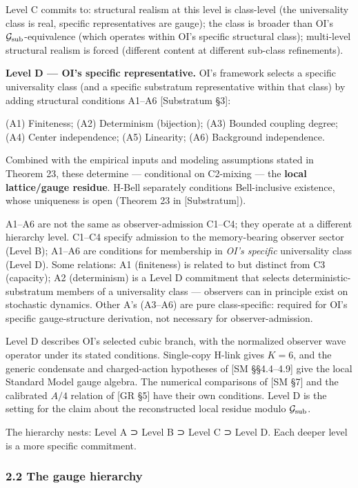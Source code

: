 \documentclass[
]{article}
\begin{document}
Level C commits to: structural realism at this level is class-level (the
universality class is real, specific representatives are gauge); the
class is broader than OI's \(\mathcal{G}_{\rm sub}\)-equivalence (which
operates within OI's specific structural class); multi-level structural
realism is forced (different content at different sub-class
refinements).

\textbf{Level D --- OI's specific representative.} OI's framework
selects a specific universality class (and a specific substratum
representative within that class) by adding structural conditions A1--A6
{[}Substratum §3{]}:

(A1) Finiteness; (A2) Determinism (bijection); (A3) Bounded coupling
degree; (A4) Center independence; (A5) Linearity; (A6) Background
independence.

Combined with the empirical inputs and modeling assumptions stated in
Theorem 23, these determine --- conditional on C2-mixing --- the
\textbf{local lattice/gauge residue}. H-Bell separately conditions
Bell-inclusive existence, whose uniqueness is open (Theorem 23 in
{[}Substratum{]}).

A1--A6 are not the same as observer-admission C1--C4; they operate at a
different hierarchy level. C1--C4 specify admission to the
memory-bearing observer sector (Level B); A1--A6 are conditions for
membership in \emph{OI's specific} universality class (Level D). Some
relations: A1 (finiteness) is related to but distinct from C3
(capacity); A2 (determinism) is a Level D commitment that selects
deterministic-substratum members of a universality class --- observers
can in principle exist on stochastic dynamics. Other A's (A3--A6) are
pure class-specific: required for OI's specific gauge-structure
derivation, not necessary for observer-admission.

Level D describes OI's selected cubic branch, with the normalized
observer wave operator under its stated conditions. Single-copy H-link
gives \(K=6\), and the generic condensate and charged-action hypotheses
of {[}SM §§4.4--4.9{]} give the local Standard Model gauge algebra. The
numerical comparisons of {[}SM §7{]} and the calibrated \(A/4\) relation
of {[}GR §5{]} have their own conditions. Level D is the setting for the
claim about the reconstructed local residue modulo
\(\mathcal G_{\rm sub}\).

The hierarchy nests: Level A ⊃ Level B ⊃ Level C ⊃ Level D. Each deeper
level is a more specific commitment.

\hypertarget{the-gauge-hierarchy}{%
\subsubsection{2.2 The gauge hierarchy}\label{the-gauge-hierarchy}}
\end{document}
